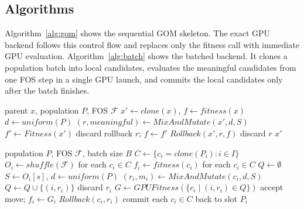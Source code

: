 \documentclass[conference]{IEEEtran}
\begin{document}
\subsection{Algorithms}

Algorithm~\ref{alg:gom} shows the sequential GOM skeleton. The exact GPU backend
follows this control flow and replaces only the fitness call with immediate GPU
evaluation. Algorithm~\ref{alg:batch} shows the batched backend. It clones a
population batch into local candidates, evaluates the meaningful candidates from
one FOS step in a single GPU launch, and commits the local candidates only after
the batch finishes.

\begin{algorithm}[t]
\caption{Sequential GOM for one parent}
\label{alg:gom}
\footnotesize
\begin{algorithmic}[1]
\REQUIRE parent \(x\), population \(P\), FOS \(\mathcal{F}\)
\STATE \(x' \leftarrow clone(x)\), \(f \leftarrow fitness(x)\)
  \STATE \(d \leftarrow uniform(P)\)
  \STATE \((r,meaningful) \leftarrow MixAndMutate(x',d,S)\)
    \STATE \(f' \leftarrow Fitness(x')\)
      \STATE discard rollback \(r\); \(f \leftarrow f'\)
    \ELSE
      \STATE \(Rollback(x',r,f)\)
    \ENDIF
  \ELSE
    \STATE discard \(r\)
  \ENDIF
\ENDFOR
\RETURN \(x'\)
\end{algorithmic}
\end{algorithm}

\begin{algorithm}[t]
\caption{Batched GPU GOM for one generation}
\label{alg:batch}
\footnotesize
\begin{algorithmic}[1]
\REQUIRE population \(P\), FOS \(\mathcal{F}\), batch size \(B\)
  \STATE \(C \leftarrow \{c_i = clone(P_i): i \in I\}\)
  \STATE \(O_i \leftarrow shuffle(\mathcal{F})\) for each \(c_i \in C\)
  \STATE \(f_i \leftarrow fitness(c_i)\) for each \(c_i \in C\)
    \STATE \(Q \leftarrow \emptyset\)
      \STATE \(S \leftarrow O_i[s]\), \(d \leftarrow uniform(P)\)
      \STATE \((r_i,m_i) \leftarrow MixAndMutate(c_i,d,S)\)
        \STATE \(Q \leftarrow Q \cup \{(i,r_i)\}\)
      \ELSE
        \STATE discard \(r_i\)
      \ENDIF
    \ENDFOR
    \STATE \(G \leftarrow GPUFitness(\{c_i \mid (i,r_i) \in Q\})\)
        \STATE accept move; \(f_i \leftarrow G_i\)
      \ELSE
        \STATE \(Rollback(c_i,r_i)\)
      \ENDIF
    \ENDFOR
  \ENDFOR
  \STATE commit each \(c_i \in C\) back to slot \(P_i\)
\ENDFOR
\end{algorithmic}
\end{algorithm}
\end{document}
